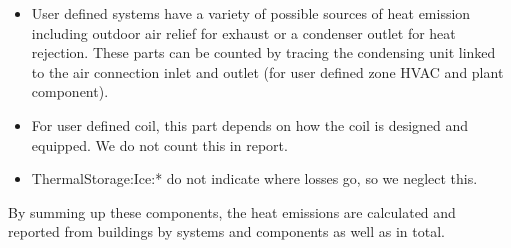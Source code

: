 \begin{itemize}
  \item User defined systems have a variety of possible sources of heat emission including outdoor air relief for exhaust or a condenser outlet for heat rejection. These parts can be counted by tracing the condensing unit linked to the air connection inlet and outlet (for user defined zone HVAC and plant component). 
  \item For user defined coil, this part depends on how the coil is designed and equipped. We do not count this in report.
  \item ThermalStorage:Ice:* do not indicate where losses go, so we neglect this.
\end{itemize}

By summing up these components, the heat emissions are calculated and reported from buildings by systems and components as well as in total.
